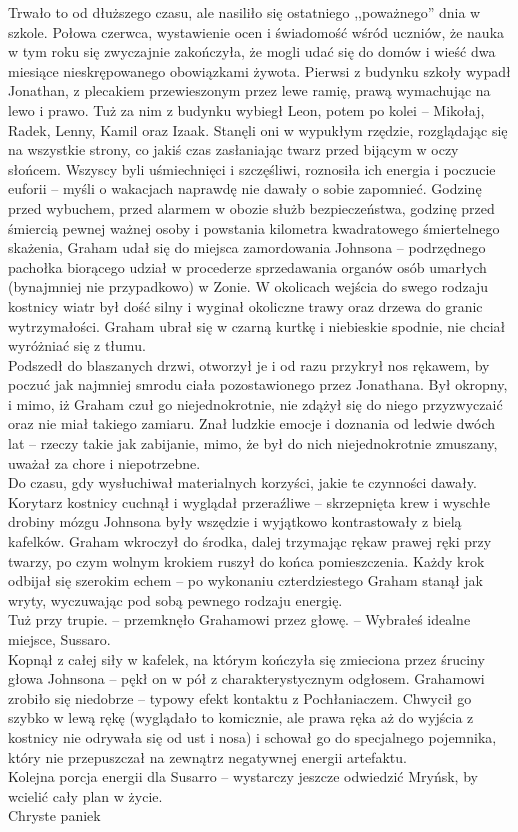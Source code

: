 \documentclass[../MAIN.tex]{subfiles}
\begin{document}
Trwało to od dłuższego czasu, ale nasiliło się ostatniego ,,poważnego'' dnia w szkole. Połowa czerwca, wystawienie ocen i świadomość wśród uczniów, że nauka w tym roku się zwyczajnie zakończyła, że mogli udać się do domów i wieść dwa miesiące nieskrępowanego obowiązkami żywota. Pierwsi z budynku szkoły wypadł Jonathan, z plecakiem przewieszonym przez lewe ramię, prawą wymachując na lewo i prawo. Tuż za nim z budynku wybiegł Leon, potem po kolei -- Mikołaj, Radek, Lenny, Kamil oraz Izaak. Stanęli oni w wypukłym rzędzie, rozglądając się na wszystkie strony, co jakiś czas zasłaniając twarz przed bijącym w oczy słońcem. Wszyscy byli uśmiechnięci i szczęśliwi, roznosiła ich energia i poczucie euforii -- myśli o wakacjach naprawdę nie dawały o sobie zapomnieć.
%
%
%
Godzinę przed wybuchem, przed alarmem w obozie służb bezpieczeństwa, godzinę przed śmiercią pewnej ważnej osoby i powstania kilometra kwadratowego śmiertelnego skażenia, Graham udał się do miejsca zamordowania Johnsona -- podrzędnego pachołka biorącego udział w procederze sprzedawania organów osób umarłych (bynajmniej nie przypadkowo) w Zonie. W okolicach wejścia do swego rodzaju kostnicy wiatr był dość silny i wyginał okoliczne trawy oraz drzewa do granic wytrzymałości. Graham ubrał się w czarną kurtkę i niebieskie spodnie, nie chciał wyróżniać się z tłumu.\\
% 
Podszedł do blaszanych drzwi, otworzył je i od razu przykrył nos rękawem, by poczuć jak najmniej smrodu ciała pozostawionego przez Jonathana. Był okropny, i mimo, iż Graham czuł go niejednokrotnie, nie zdążył się do niego przyzwyczaić oraz nie miał takiego zamiaru. Znał ludzkie emocje i doznania od ledwie dwóch lat -- rzeczy takie jak zabijanie, mimo, że był do nich niejednokrotnie zmuszany, uważał za chore i niepotrzebne.\\
% 
Do czasu, gdy wysłuchiwał materialnych korzyści, jakie te czynności dawały.\\
% 
Korytarz kostnicy cuchnął i wyglądał przeraźliwe -- skrzepnięta krew i wyschłe drobiny mózgu Johnsona były wszędzie i wyjątkowo kontrastowały z bielą kafelków. Graham wkroczył do środka, dalej trzymając rękaw prawej ręki przy twarzy, po czym wolnym krokiem ruszył do końca pomieszczenia. Każdy krok odbijał się szerokim echem -- po wykonaniu czterdziestego Graham stanął jak wryty, wyczuwając pod sobą pewnego rodzaju energię.\\
% 
Tuż przy trupie. -- przemknęło Grahamowi przez głowę. -- Wybrałeś idealne miejsce, Sussaro.\\
% 
Kopnął z całej siły w kafelek, na którym kończyła się zmieciona przez śruciny głowa Johnsona -- pękł on w pół z charakterystycznym odgłosem. Grahamowi zrobiło się niedobrze -- typowy efekt kontaktu z Pochłaniaczem. Chwycił go szybko w lewą rękę (wyglądało to komicznie, ale prawa ręka aż do wyjścia z kostnicy nie odrywała się od ust i nosa) i schował go do specjalnego pojemnika, który nie przepuszczał na zewnątrz negatywnej energii artefaktu.\\
% 
Kolejna porcja energii dla Susarro -- wystarczy jeszcze odwiedzić Mryńsk, by wcielić cały plan w życie.\\
Chryste panie\3k
 
\end{document}
